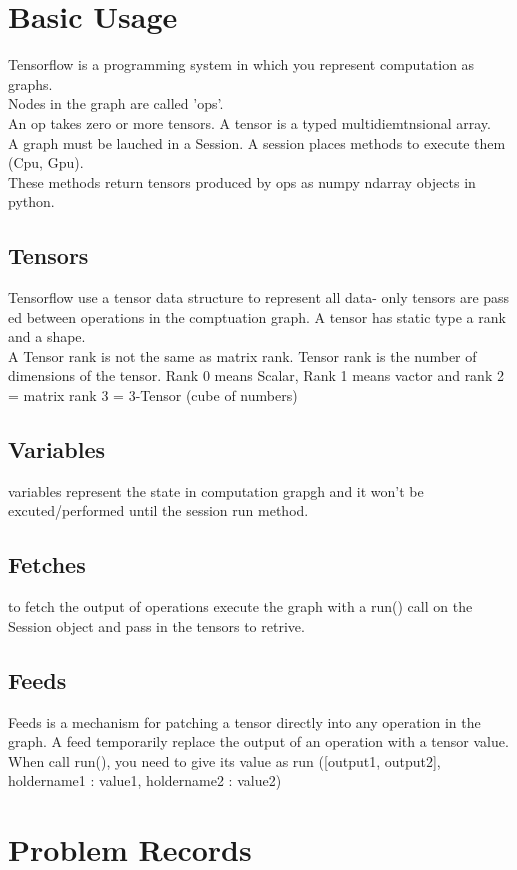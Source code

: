 \documentclass{article}
\begin{document}
\section{Basic Usage}
Tensorflow is a programming system in which you represent computation as graphs.\\
Nodes in the graph are called 'ops'. \\
An op takes zero or more tensors.
A tensor is a typed multidiemtnsional array. \\
A graph must be lauched in a Session. A session places methods to execute them (Cpu, Gpu). \\
These methods return tensors produced by ops as numpy ndarray objects in python.

\subsection{Tensors}
Tensorflow use a tensor data structure to represent all data- only tensors are pass ed between  operations in the comptuation graph.
A tensor has static type a rank and a shape. \\
A Tensor rank is not the same as matrix rank. Tensor rank  is the number of dimensions of the tensor. Rank 0 means Scalar, Rank 1 means vactor and rank 2 = matrix rank 3 = 3-Tensor (cube of numbers)
\subsection{Variables}
variables represent the state in computation grapgh and it won't be excuted/performed until the session run method.

\subsection{Fetches}
to fetch the output of operations execute the graph with a run() call on the Session object and pass in the tensors to retrive.
\subsection{Feeds}
Feeds is a mechanism for patching a tensor directly into any operation in the graph.
A feed temporarily replace the output of an operation with a tensor value. When call run(), you need to give its value as run ([output1, output2], {holdername1 : value1, holdername2 : value2})

\section{Problem Records}
\end{document}

